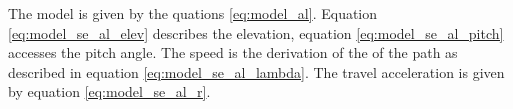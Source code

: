 The model is given by the quations \eqref{eq:model_al}. Equation \eqref{eq:model_se_al_elev} describes the elevation, equation \eqref{eq:model_se_al_pitch} accesses the pitch angle. The speed is the derivation of the of the path as described in equation \eqref{eq:model_se_al_lambda}. The travel acceleration is given by equation \eqref{eq:model_se_al_r}.  


